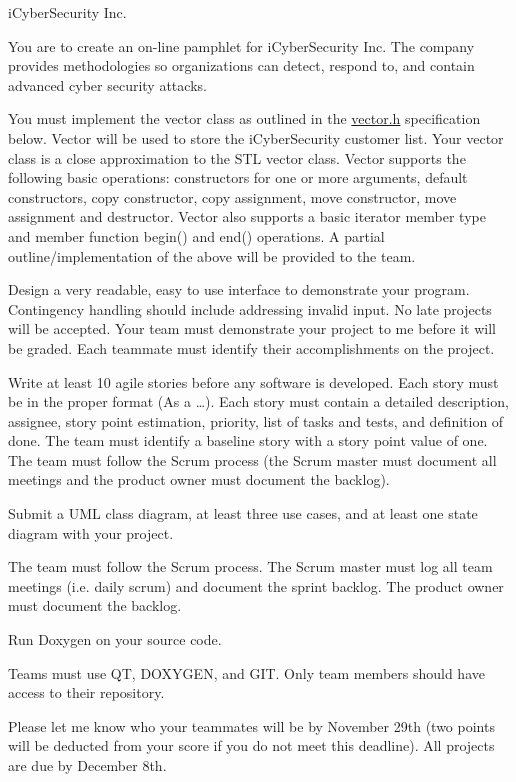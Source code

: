 i\+Cyber\+Security Inc.

You are to create an on-\/line pamphlet for i\+Cyber\+Security Inc. The company provides methodologies so organizations can detect, respond to, and contain advanced cyber security attacks.

You must implement the vector class as outlined in the \hyperlink{vector_8h_source}{vector.\+h} specification below. Vector will be used to store the i\+Cyber\+Security customer list. Your vector class is a close approximation to the S\+TL vector class. Vector supports the following basic operations\+: constructors for one or more arguments, default constructors, copy constructor, copy assignment, move constructor, move assignment and destructor. Vector also supports a basic iterator member type and member function begin() and end() operations. A partial outline/implementation of the above will be provided to the team.

Design a very readable, easy to use interface to demonstrate your program. Contingency handling should include addressing invalid input. No late projects will be accepted. Your team must demonstrate your project to me before it will be graded. Each teammate must identify their accomplishments on the project.

Write at least 10 agile stories before any software is developed. Each story must be in the proper format (As a …). Each story must contain a detailed description, assignee, story point estimation, priority, list of tasks and tests, and definition of done. The team must identify a baseline story with a story point value of one. The team must follow the Scrum process (the Scrum master must document all meetings and the product owner must document the backlog).

Submit a U\+ML class diagram, at least three use cases, and at least one state diagram with your project.

The team must follow the Scrum process. The Scrum master must log all team meetings (i.\+e. daily scrum) and document the sprint backlog. The product owner must document the backlog.

Run Doxygen on your source code.

Teams must use QT, D\+O\+X\+Y\+G\+EN, and G\+IT. Only team members should have access to their repository.

Please let me know who your teammates will be by November 29th (two points will be deducted from your score if you do not meet this deadline). All projects are due by December 8th.

